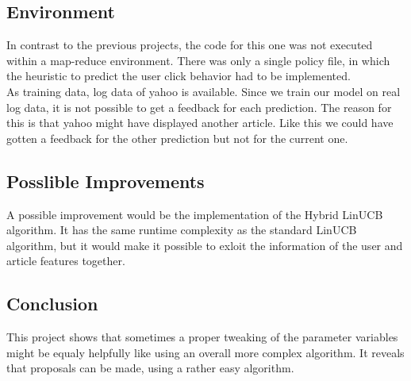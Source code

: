 \documentclass[a4paper, 11pt]{article}
\begin{document}
\subsection{Environment}
In contrast to the previous projects, the code for this one was not executed within a map-reduce environment. There was only a single policy file, in which the heuristic to predict the user click behavior had to be implemented.\\
As training data, log data of yahoo is available. Since we train our model on real log data, it is not possible to get a feedback for each prediction. The reason for this is that yahoo might have displayed another article. Like this we could have gotten a feedback for the other prediction but not for the current one.


\subsection{Posslible Improvements}
A possible improvement would be the implementation of the Hybrid LinUCB algorithm. It has the same runtime complexity as the standard LinUCB algorithm, but it would make it possible to exloit the information of the user and article features together.

\subsection{Conclusion}
This project shows that sometimes a proper tweaking of the parameter variables might be equaly helpfully like using an overall more complex algorithm. It reveals that proposals can be made, using a rather easy algorithm.
\end{document}
